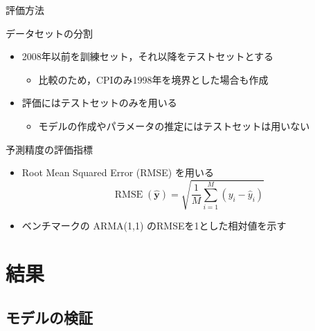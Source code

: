 \documentclass[dvipdfmx,aspectratio=169]{beamer}
\DeclareMathOperator{\RMSE}{RMSE}
\begin{document}
\begin{frame}{評価方法}
\begin{block}{データセットの分割}
  \begin{itemize}
    \item 2008年以前を訓練セット，それ以降をテストセットとする
    \begin{itemize}
      \item 比較のため，CPIのみ1998年を境界とした場合も作成
    \end{itemize}
    \item 評価にはテストセットのみを用いる
    \begin{itemize}
      \item モデルの作成やパラメータの推定にはテストセットは用いない
    \end{itemize}
  \end{itemize}
\end{block}
\begin{block}{予測精度の評価指標}
  \begin{itemize}
    \item Root Mean Squared Error (RMSE) を用いる
    \begin{equation}
      \textstyle
      \RMSE(\bm{\hat{y}}) = \sqrt{\frac{1}{M}\sum_{i=1}^{M}(y_i - \hat{y}_i)}
      \nonumber
    \end{equation}
    \item ベンチマークの ARMA(1,1) のRMSEを1とした相対値を示す
  \end{itemize}
\end{block}
\end{frame}

\section{結果}

\subsection{モデルの検証}
\end{document}

